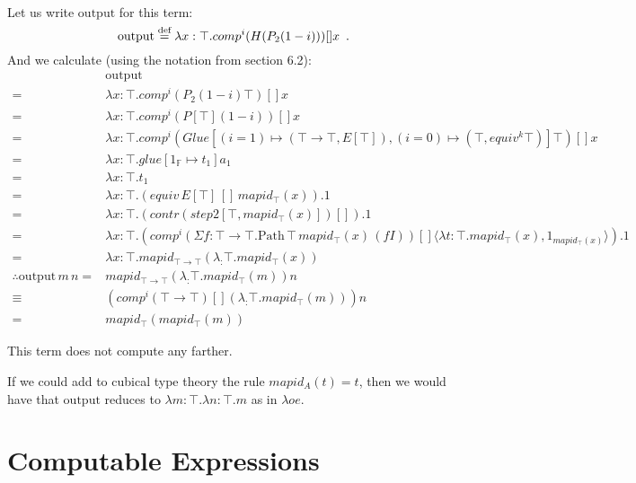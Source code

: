 \documentclass[a4paper,UKenglish]{lipics-v2016}
\newcommand*{\eqdef}{\mathrel{\smash{\stackrel{\text{def}}{=}}}}
\newcommand{\Path}[3]{\ensuremath{\mathrm{Path} \, {#1} \, {#2} \, {#3}}}
\newcommand{\outputt}{\mathrm{output}}
\theoremstyle{plain}
\theoremstyle{definition}
\begin{document}
Let us write $\outputt$ for this term:
\[ \outputt \eqdef \lambda x : \top. comp^i (H (P_2 (1 - i))) [] x \enspace . \]
And we calculate (using the notation from \cite{cchm:cubical} section 6.2):
\begin{align*}
& \outputt \\
= & \lambda x : \top. comp^i (P_2 (1 - i) \top) [] x \\
= & \lambda x : \top. comp^i (P[\top] (1 - i)) [] x \\
= & \lambda x : \top. comp^i (Glue[(i = 1) \mapsto (\top \rightarrow \top, E[\top]), (i = 0) \mapsto (\top, equiv^k \top)] \top) [] x \\
= & \lambda x : \top. glue [ 1_\mathbb{F} \mapsto t_1 ] a_1 \\
= & \lambda x : \top. t_1 \\
= & \lambda x : \top. (equiv \, E[\top] \, [] \, mapid_\top(x)).1 \\
= & \lambda x : \top. (contr (step2[\top, mapid_\top(x)]) []).1 \\
= & \lambda x : \top. (comp^i (\Sigma f : \top \rightarrow \top. \Path{\top}{mapid_\top(x)}{(fI)}) [] \langle \lambda t : \top. mapid_\top(x), 1_{mapid_\top(x)} \rangle).1 \\
= & \lambda x : \top. mapid_{\top \rightarrow \top}(\lambda _ : \top. mapid_\top(x)) \\
\therefore \outputt \, m \, n = & mapid_{\top \rightarrow \top}(\lambda _ : \top. mapid_\top(m)) n \\
\equiv & (comp^i (\top \rightarrow \top) [] (\lambda _ : \top. mapid_\top(m))) n \\
= & mapid_\top(mapid_\top(m))
\end{align*}

This term does not compute any farther.

If we could add to cubical type theory the rule $mapid_A(t) = t$, then we would have that $\outputt$ reduces to $\lambda m : \top. \lambda n : \top. m$ as in $\lambda o e$.
\section{Computable Expressions}
\end{document}
